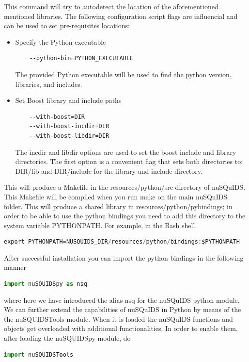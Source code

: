 \documentclass[3p,12pt]{elsarticle}
\newcommand{\ttf}{\ttfamily}
\begin{document}
This command will try to autodetect the location of the aforementioned mentioned libraries.
The following configuration script flags are influencial and can be used to set pre-requisites locations:
\begin{itemize}
  \item Specify the Python executable
  \begin{lstlisting}
    --python-bin=PYTHON_EXECUTABLE
  \end{lstlisting}
  The provided {\ttf Python} executable will be used to find the python version, libraries, and includes.
  \item Set Boost library and include paths
  \begin{lstlisting}
    --with-boost=DIR
    --with-boost-incdir=DIR
    --with-boost-libdir=DIR
  \end{lstlisting}
  The {\ttf incdir} and {\ttf libdir} options are used to set the boost include and library directories. 
    The first option is a convenient flag that sets both directories to: {\ttf DIR/lib} and {\ttf DIR/include} for the library and include directory.

\end{itemize}
This will produce a {\ttf Makefile} in the {\ttf resources/python/src} directory of nuSQuIDS. This Makefile will be compiled when you run {\ttf make} on the main nuSQuIDS folder. This will produce a shared library in {\ttf resources/python/pybindings}; in order to be able to use the python bindings you need to add this directory to the system variable {\ttf PYTHONPATH}. For example, in the Bash shell
\begin{lstlisting}[language=Python]
export PYTHONPATH=NUSQUIDS_DIR/resources/python/bindings:$PYTHONPATH
\end{lstlisting}

After successful installation you can import the python bindings in the following manner
\begin{lstlisting}[language=Python]
import nuSQUIDSpy as nsq
\end{lstlisting}
where here we have introduced the alias {\ttfamily nsq} for the nuSQuIDS python module. We can further extend the
capabilities of nuSQuIDS in {\ttfamily Python} by means of the the {\ttfamily nuSQUIDSTools} module.
When it is loaded the nuSQuIDS functions and objects get overloaded with additional functionalities. In order to enable them, after loading the {\ttfamily nuSQUIDSpy} module, do
\begin{lstlisting}[language=Python]
import nuSQUIDSTools
\end{lstlisting}
\end{document}
